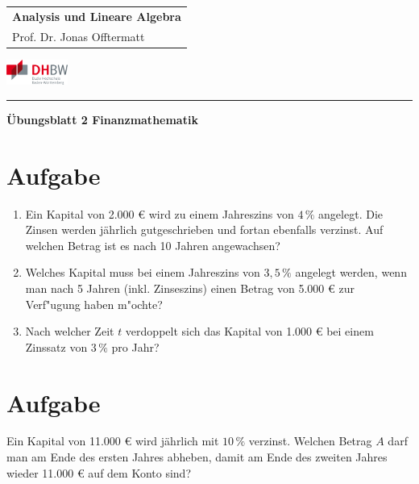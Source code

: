 \documentclass[fontsize=11pt, parskip=half]{scrartcl}
\begin{document}
\noindent
\begin{tabular}{l}
    \textbf{Analysis und Lineare Algebra} \\    
    Prof. Dr. Jonas Offtermatt
\end{tabular}
\hfill \includegraphics[width=2cm]{DHBW.pdf}\\
\rule{\textwidth}{0.5pt}


\begin{center}
    \Large
    \textbf{Übungsblatt 2 Finanzmathematik}
\end{center}

\section{Aufgabe}
\begin{enumerate}
    \item Ein Kapital von 2.000 € wird zu einem Jahreszins von $4
    \,\%$ angelegt. Die Zinsen werden jährlich gutgeschrieben und fortan
    ebenfalls verzinst. Auf welchen Betrag ist es nach 10 Jahren
    angewachsen?
    \item Welches Kapital muss bei einem Jahreszins von $3,5 \,\%$
    angelegt werden, wenn man nach 5 Jahren (inkl. Zinseszins) einen
    Betrag von 5.000 € zur Verf"ugung haben m"ochte? \item Nach
    welcher Zeit $t$ verdoppelt sich das Kapital von 1.000 € bei
    einem Zinssatz von $3\,\%$ pro Jahr?
    \end{enumerate}
    

    
    \section{Aufgabe} 
    Ein Kapital von 11.000 € wird jährlich mit $10\,\%$
    verzinst. Welchen Betrag $A$ darf man am Ende des ersten Jahres
    abheben, damit am Ende des zweiten Jahres wieder 11.000 € auf
    dem Konto sind?
    

    
\end{document}
